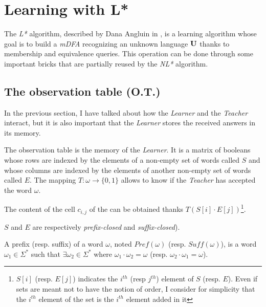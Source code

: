\section{Learning with L* }
\label{section:L}

The \textit{L*} algorithm, described by Dana Angluin in \cite{LPaper}, is a learning algorithm whose goal is to build a \textit{mDFA} recognizing an unknown language $\mathbf{U}$ thanks to membership and equivalence queries. This operation can be done through some important bricks that are partially reused by the \textit{NL*} algorithm.

\subsection{The observation table (O.T.)}
In the previous section, I have talked about how the \textit{Learner} and the \textit{Teacher} interact, but it is also important that the \textit{Learner} stores the received answers in its memory.

\begin{definition}
  The observation table is the memory of the \textit{Learner}. It is a matrix of booleans whose rows are indexed by the elements of a non-empty set of words called $S$ and whose columns are indexed by the elements of another non-empty set of words called $E$. The mapping $T: \omega \rightarrow \{0, 1\}$ allows to know if the \textit{Teacher} has accepted the word $\omega$.
\end{definition}

\begin{example}
  The content of the cell $c_{i,j}$ of the \OT can be obtained thanks  $T(S[i] \cdot E[j])$\footnote{$S[i]$ (resp. $E[j]$) indicates the $i^{th}$ (resp $j^{th}$) element of $S$ (resp. $E$). Even if sets are meant not  to have the notion of order, I consider for simplicity that the $i^{th}$ element of the set is the $i^{th}$ element added in it}.
\end{example}

$S$ and $E$ are respectively \textit{prefix-closed} and \textit{suffix-closed}).

\begin{definition}
  A prefix (resp. suffix) of a word $\omega$, noted $Pref(\omega)$ (resp. $Suff(\omega)$), is a word $\omega_1 \in \Sigma^*$ such that $\exists \omega_2 \in \Sigma^*$ where $\omega_1 \cdot \omega_2 = \omega$ (resp. $\omega_2 \cdot \omega_1 = \omega$).
\end{definition}

